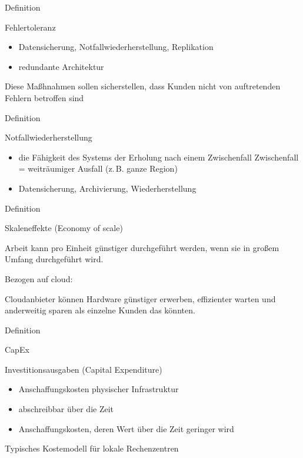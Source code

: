 \documentclass{scrartcl}
\newenvironment{flashcard}[2][]{%
    #1
    \vfill
    \centerline{\Large{#2}}
    \vfill
\newpage
}
{\newpage}
\begin{document}
    \begin{flashcard}[Definition]{Fehlertoleranz}

        \begin{itemize}
            \item Datensicherung, Notfallwiederherstellung, Replikation
            \item redundante Architektur
        \end{itemize}
        Diese Maßhnahmen sollen sicherstellen, dass Kunden nicht von auftretenden Fehlern betroffen sind
    \end{flashcard}

    \begin{flashcard}[Definition]{Notfallwiederherstellung}
        \begin{itemize}
            \item die Fähigkeit des Systems der Erholung nach einem Zwischenfall\newline
            Zwischenfall = weiträumiger Ausfall (z.\,B. ganze Region)
            \item Datensicherung, Archivierung, Wiederherstellung
        \end{itemize}

    \end{flashcard}

    \begin{flashcard}[Definition]{Skaleneffekte (Economy of scale)}
        Arbeit kann pro Einheit günstiger durchgeführt werden, wenn sie in großem Umfang durchgeführt wird.

        \vspace{5mm}
        Bezogen auf cloud:

        Cloudanbieter können Hardware günstiger erwerben, effizienter warten und anderweitig sparen als einzelne Kunden das könnten.
    \end{flashcard}

    \begin{flashcard}[Definition]{CapEx}

        Investitionsausgaben (Capital Expenditure)
        \begin{itemize}
            \item Anschaffungskosten physischer Infrastruktur
            \item abschreibbar über die Zeit
            \item Anschaffungskosten, deren Wert über die Zeit geringer wird
        \end{itemize}

        Typisches Kostemodell für lokale Rechenzentren

    \end{flashcard}
\end{document}
